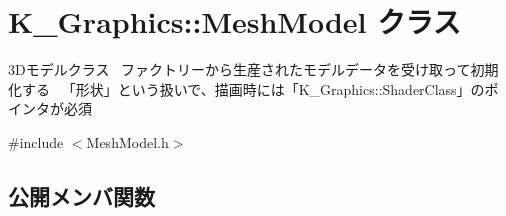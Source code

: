 \hypertarget{class_k___graphics_1_1_mesh_model}{}\section{K\+\_\+\+Graphics\+:\+:Mesh\+Model クラス}
\label{class_k___graphics_1_1_mesh_model}


3\+Dモデルクラス~\newline
ファクトリーから生産されたモデルデータを受け取って初期化する~\newline
「形状」という扱いで、描画時には「\+K\+\_\+\+Graphics\+::\+Shader\+Class」のポインタが必須  




{\ttfamily \#include $<$Mesh\+Model.\+h$>$}

\subsection*{公開メンバ関数}
